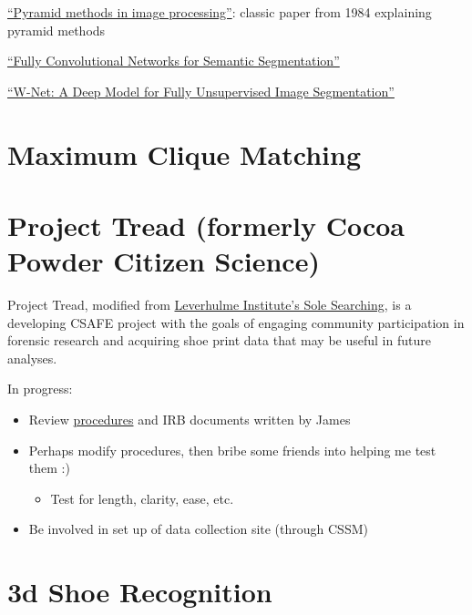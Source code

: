 \documentclass[]{book}
\providecommand{\tightlist}{%
  \setlength{\itemsep}{0pt}\setlength{\parskip}{0pt}}
\begin{document}
\href{http://citeseerx.ist.psu.edu/viewdoc/summary?doi=10.1.1.56.8646}{``Pyramid methods in image processing''}: classic paper from 1984 explaining pyramid methods

\href{https://people.eecs.berkeley.edu/~jonlong/long_shelhamer_fcn.pdf}{``Fully Convolutional Networks for Semantic Segmentation''}

\href{https://arxiv.org/pdf/1711.08506.pdf}{``W-Net: A Deep Model for Fully Unsupervised Image Segmentation''}

\hypertarget{maxclique}{%
\section{Maximum Clique Matching}\label{maxclique}}

\hypertarget{cocoa}{%
\section{Project Tread (formerly Cocoa Powder Citizen Science)}\label{cocoa}}

Project Tread, modified from \href{https://www.dundee.ac.uk/leverhulme/citizenscience/details/sole-searching.php}{Leverhulme Institute's Sole Searching}, is a developing CSAFE project with the goals of engaging community participation in forensic research and acquiring shoe print data that may be useful in future analyses.

In progress:

\begin{itemize}
\tightlist
\item
  Review \href{https://forensicstats.org/project-tread/}{procedures} and IRB documents written by James
\item
  Perhaps modify procedures, then bribe some friends into helping me test them :)

  \begin{itemize}
  \tightlist
  \item
    Test for length, clarity, ease, etc.
  \end{itemize}
\item
  Be involved in set up of data collection site (through CSSM)
\end{itemize}

\hypertarget{d-shoe-recognition}{%
\section{3d Shoe Recognition}\label{d-shoe-recognition}}
\end{document}
